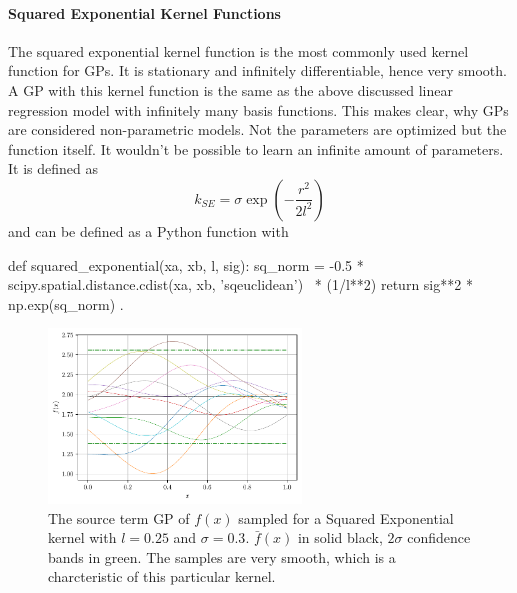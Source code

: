 \documentclass[%
  a4paper,oneside,%
  11pt,%
  smallchapters,
  style=printdev,
  extramargin,
  green,%
  rgb, <cmyk>
  ]{tubsbook}
\begin{document}
\paragraph{Squared Exponential Kernel Functions}
The squared exponential kernel function is the most commonly used kernel function for GPs. It is stationary and infinitely differentiable, hence very smooth. A GP with this kernel function is the same as the above discussed linear regression model with infinitely many basis functions. \cite{rasmussen2006} This makes clear, why GPs are considered non-parametric models. Not the parameters are optimized but the function itself. It wouldn't be possible to learn an infinite amount of parameters.
It is defined as
\begin{equation}
k_{SE} = \sigma \exp(-\frac{r^2}{2l^2})
\end{equation}
%
and can be defined as a Python function with
\begin{python}
def squared_exponential(xa, xb, l, sig):
    sq_norm = -0.5 * scipy.spatial.distance.cdist(xa, xb, 'sqeuclidean') \
    	* (1/l**2)
    return sig**2 * np.exp(sq_norm) .
\end{python}
\label{lst:sqEx}
\cite{murphy2012}

\begin{figure}[!ht]
\begin{center}

\includegraphics[width=0.6\textwidth]{pics/sqexp_f_sampled}
\caption{The source term GP of $f(x)$ sampled for a Squared Exponential kernel with $l = 0.25$ and $\sigma = 0.3$. $\bar{f}(x)$ in solid black, $2\sigma$ confidence bands in green. The samples are very smooth, which is a charcteristic of this particular kernel.}
\label{fig:Matern1_2}

\end{center}
\end{figure}
\end{document}
